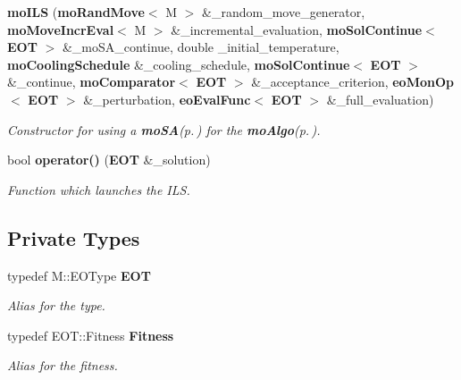 \begin{CompactItemize}
{\bf mo\-ILS} ({\bf mo\-Rand\-Move}$<$ M $>$ \&\_\-random\_\-move\_\-generator, {\bf mo\-Move\-Incr\-Eval}$<$ M $>$ \&\_\-incremental\_\-evaluation, {\bf mo\-Sol\-Continue}$<$ {\bf EOT} $>$ \&\_\-mo\-SA\_\-continue, double \_\-initial\_\-temperature, {\bf mo\-Cooling\-Schedule} \&\_\-cooling\_\-schedule, {\bf mo\-Sol\-Continue}$<$ {\bf EOT} $>$ \&\_\-continue, {\bf mo\-Comparator}$<$ {\bf EOT} $>$ \&\_\-acceptance\_\-criterion, {\bf eo\-Mon\-Op}$<$ {\bf EOT} $>$ \&\_\-perturbation, {\bf eo\-Eval\-Func}$<$ {\bf EOT} $>$ \&\_\-full\_\-evaluation)
\begin{CompactList}\small\item\em Constructor for using a {\bf mo\-SA}{\rm (p.\,\pageref{classmo_s_a})} for the {\bf mo\-Algo}{\rm (p.\,\pageref{classmo_algo})}. \item\end{CompactList}\item 
bool {\bf operator()} ({\bf EOT} \&\_\-solution)
\begin{CompactList}\small\item\em Function which launches the ILS. \item\end{CompactList}\end{CompactItemize}
\subsection*{Private Types}
\begin{CompactItemize}
\item 
typedef M::EOType {\bf EOT}\label{classmo_i_l_s_y0}

\begin{CompactList}\small\item\em Alias for the type. \item\end{CompactList}\item 
typedef EOT::Fitness {\bf Fitness}\label{classmo_i_l_s_y1}

\begin{CompactList}\small\item\em Alias for the fitness. \item\end{CompactList}\end{CompactItemize}
